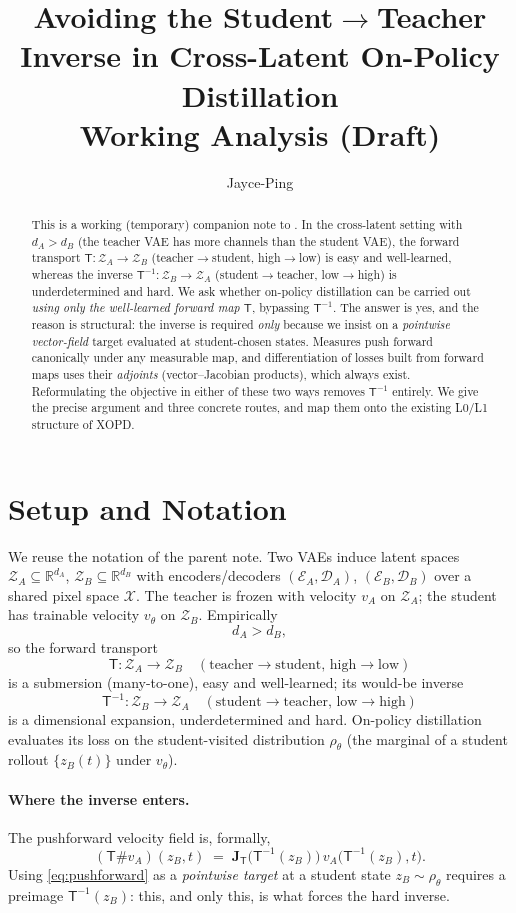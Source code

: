 \documentclass[11pt,a4paper]{article}
\title{\textbf{Avoiding the Student$\to$Teacher Inverse in Cross-Latent On-Policy Distillation}\\[0.3em]
\large Working Analysis (Draft)}
\author{Jayce-Ping}
\date{}
\newcommand{\R}{\mathbb{R}}
\newcommand{\Xspace}{\mathcal{X}}
\newcommand{\Za}{\mathcal{Z}_{A}}
\newcommand{\Zb}{\mathcal{Z}_{B}}
\newcommand{\Enc}{\mathcal{E}}
\newcommand{\Dec}{\mathcal{D}}
\newcommand{\Tmap}{\mathsf{T}}
\newcommand{\Tinv}{\mathsf{T}^{-1}}
\newcommand{\push}{\#}
\newcommand{\Jac}{\mathbf{J}}
\theoremstyle{definition}
\begin{document}
\maketitle

\begin{abstract}
This is a working (temporary) companion note to
. In the cross-latent setting with
$d_A>d_B$ (the teacher VAE has more channels than the student VAE), the forward transport
$\Tmap:\Za\to\Zb$ (teacher$\to$student, high$\to$low) is easy and well-learned, whereas the
inverse $\Tinv:\Zb\to\Za$ (student$\to$teacher, low$\to$high) is underdetermined and hard.
We ask whether on-policy distillation can be carried out \emph{using only the well-learned
forward map $\Tmap$}, bypassing $\Tinv$. The answer is yes, and the reason is structural:
the inverse is required \emph{only} because we insist on a \emph{pointwise vector-field}
target evaluated at student-chosen states. Measures push forward canonically under any
measurable map, and differentiation of losses built from forward maps uses their
\emph{adjoints} (vector--Jacobian products), which always exist. Reformulating the objective
in either of these two ways removes $\Tinv$ entirely. We give the precise argument and three
concrete routes, and map them onto the existing L0/L1 structure of XOPD.
\end{abstract}

\section{Setup and Notation}
\label{sec:setup}

We reuse the notation of the parent note. Two VAEs induce latent spaces
$\Za\subseteq\R^{d_A}$, $\Zb\subseteq\R^{d_B}$ with encoders/decoders
$(\Enc_A,\Dec_A)$, $(\Enc_B,\Dec_B)$ over a shared pixel space $\Xspace$. The teacher is
frozen with velocity $v_A$ on $\Za$; the student has trainable velocity $v_\theta$ on $\Zb$.
Empirically
\[
d_A > d_B ,
\]
so the forward transport
\[
\Tmap:\Za\to\Zb\quad(\text{teacher}\to\text{student, high}\to\text{low})
\]
is a submersion (many-to-one), easy and well-learned; its would-be inverse
\[
\Tinv:\Zb\to\Za\quad(\text{student}\to\text{teacher, low}\to\text{high})
\]
is a dimensional expansion, underdetermined and hard. On-policy distillation evaluates its
loss on the student-visited distribution $\rho_\theta$ (the marginal of a student rollout
$\{z_B(t)\}$ under $v_\theta$).

\paragraph{Where the inverse enters.}
The pushforward velocity field is, formally,
\begin{equation}
(\Tmap\push v_A)(z_B,t)
\;=\;
\Jac_{\Tmap}\!\big(\Tinv(z_B)\big)\,v_A\!\big(\Tinv(z_B),t\big).
\label{eq:pushforward}
\end{equation}
Using \eqref{eq:pushforward} as a \emph{pointwise target} at a student state $z_B\sim\rho_\theta$
requires a preimage $\Tinv(z_B)$: this, and only this, is what forces the hard inverse.
\end{document}
